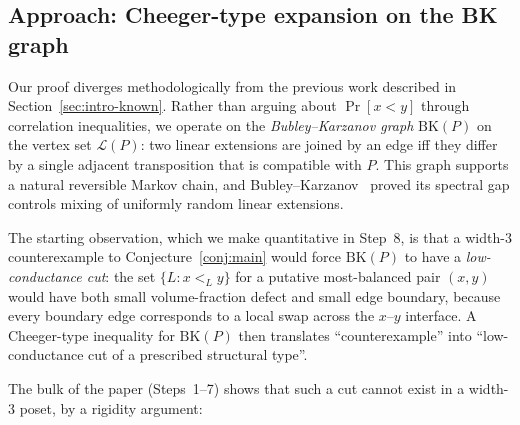 \documentclass[11pt]{article}
\theoremstyle{definition}
\theoremstyle{remark}
\newcommand{\LP}{\mathcal{L}(P)}
\newcommand{\BK}{\mathrm{BK}}
\begin{document}
\subsection{Approach: Cheeger-type expansion on the BK graph}

Our proof diverges methodologically from the previous work described
in Section~\ref{sec:intro-known}.  Rather than arguing about
$\Pr[x<y]$ through correlation inequalities, we operate on the
\emph{Bubley--Karzanov graph} $\BK(P)$ on the vertex set $\LP$: two
linear extensions are joined by an edge iff they differ by a single
adjacent transposition that is compatible with $P$.  This graph
supports a natural reversible Markov chain, and
Bubley--Karzanov~\cite{BubleyKarzanov1998} proved its spectral gap
controls mixing of uniformly random linear extensions.

The starting observation, which we make quantitative in Step~8, is
that a width-$3$ counterexample to Conjecture~\ref{conj:main} would
force $\BK(P)$ to have a \emph{low-conductance cut}: the set
$\{L : x<_L y\}$ for a putative most-balanced pair $(x,y)$ would have
both small volume-fraction defect and small edge boundary, because
every boundary edge corresponds to a local swap across the $x$--$y$
interface.  A Cheeger-type inequality for $\BK(P)$ then translates
``counterexample'' into ``low-conductance cut of a prescribed
structural type''.

The bulk of the paper (Steps~1--7) shows that such a cut cannot exist
in a width-$3$ poset, by a rigidity argument:
\end{document}
